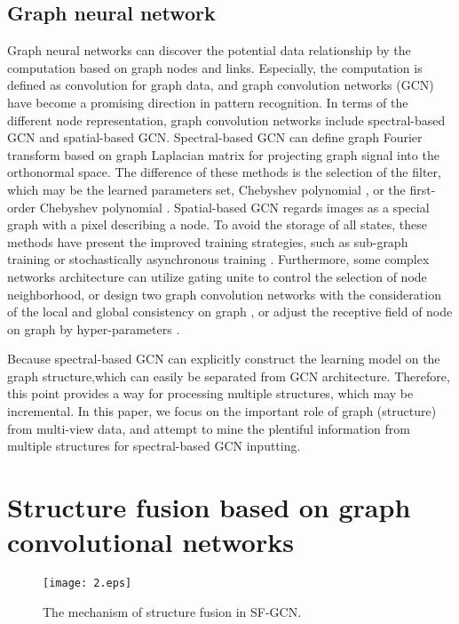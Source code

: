 \documentclass[review]{elsarticle}
\begin{document}
\subsection{Graph neural network}
Graph neural networks can discover the potential data relationship by the computation based on graph nodes and links. Especially, the computation is defined as convolution for graph data, and graph convolution networks (GCN) have become a promising direction in pattern recognition. In terms of the different node representation, graph convolution networks include spectral-based GCN and spatial-based GCN. Spectral-based GCN can define graph Fourier transform based on graph Laplacian matrix for projecting graph signal into the orthonormal space. The difference of these methods is the selection of the filter, which may be the learned parameters set\cite{bruna2013spectral}, Chebyshev polynomial \cite{defferrard2016convolutional}, or the first-order Chebyshev polynomial\cite{kipf2016semi} \cite{chen2018fastgcn}. Spatial-based GCN regards images as a special graph with a pixel describing a node. To avoid the storage of all states, these methods have present the improved training strategies, such as sub-graph training \cite{hamilton2017inductive}or stochastically asynchronous training \cite{dai2018learning}. Furthermore, some complex networks architecture can utilize gating unite to control the selection of node neighborhood\cite{liu2018geniepath}, or design two graph convolution networks with the consideration of the local and global consistency on graph\cite{zhuang2018dual} , or adjust the receptive field of node on graph by hyper-parameters \cite{van2018filter}.

Because spectral-based GCN can explicitly construct the learning model on the graph structure,which can easily be separated from GCN architecture. Therefore, this point provides a way for processing multiple structures, which may be incremental. In this paper, we focus on the important role of graph (structure) from multi-view data, and attempt to mine the plentiful information from multiple structures for spectral-based GCN inputting.

\section{Structure fusion based on graph convolutional networks}

 \begin{figure*}[ht]
  \begin{center}
\texttt{[image: 2.eps]}
\end{center}
\vspace{-0.2in}
 \caption{The mechanism of structure fusion in SF-GCN.}
  \label{SF-GCN2}
 \end{figure*}
\end{document}
